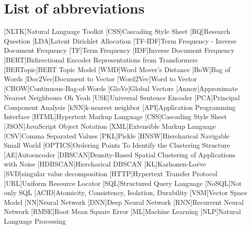 \chapter*{List of abbreviations}


\begin{acronym}[XXXXXXXXX]
    [NLTK]{Natural Language Toolkit}
    [CSS]{Cascading Style Sheet}
    [RQ]{Research Question}
    [LDA]{Latent Dirichlet Allocation}
    [TF-IDF]{Term Frequency - Inverse Document Frequency}
    [TF]{Term Frequency}
    [IDF]{Inverse Document Frequency}
    [BERT]{Bidirectional Encoder Representations from Transformers}
    [BERTopic]{BERT Topic Model}
    [WMD]{Word Mover's Distance}
    [BoW]{Bag of Words}
    [Doc2Vec]{Document to Vector}
    [Word2Vec]{Word to Vector}
    [CBOW]{Continuous-Bag-of-Words}
    [GloVe]{Global Vectors}
    [Annoy]{Approximate Nearest Neighbours Oh Yeah}
    [USE]{Universal Sentence Encoder}
    [PCA]{Principal Component Analysis}
    [kNN]{k-nearest neighbor}
    [API]{Application Programming Interface}
    [HTML]{Hypertext Markup Language}
    [CSS]{Cascading Style Sheet}
    [JSON]{JavaScript Object Notation}
    [XML]{Extensible Markup Language}
    [CSV]{Comma Separated Values}
    [PKL]{Pickle}
    [HNSW]{Hiercharical Navigable Small World}
    [OPTICS]{Ordering Points To Identify the Clustering Structure}
    [AE]{Autoencoder}
    [DBSCAN]{Density-Based Spatial Clustering of Applications with Noise}
    [HDBSCAN]{Hiercharical DBSCAN}
    [KL]{Karhonen-Loéve}
    [SVD]{singular value decomposition}
    [HTTP]{Hypertext Transfer Protocol}
    [URL]{Uniform Resource Locator}
    [SQL]{Structured Query Language}
    [NoSQL]{Not only SQL}
    [ACID]{Atomicity, Consistency, Isolation, Durability}
    [VSM]{Vector Space Model}
    [NN]{Neural Network}
    [DNN]{Deep Neural Network}
    [RNN]{Recurrent Neural Network}
    [RMSE]{Root Mean Square Error}
    [ML]{Machine Learning}
    [NLP]{Natural Language Processing}

\end{acronym}
